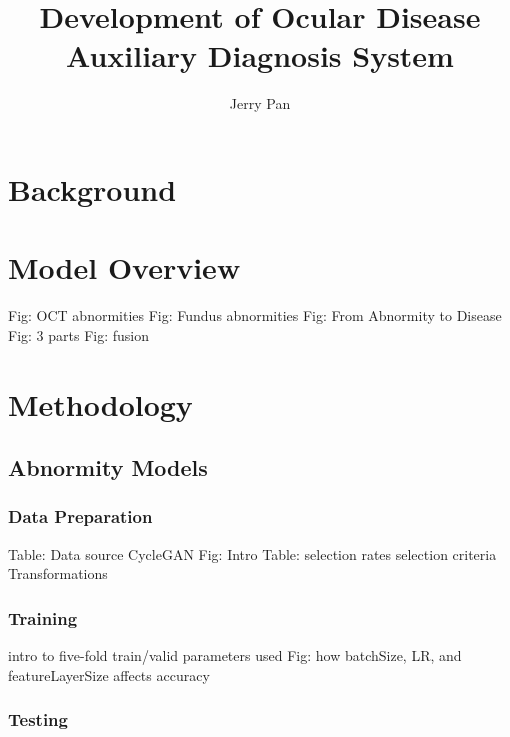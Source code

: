 \documentclass{article}
\begin{document}
	\title{\vspace{-2.25cm} Development of Ocular Disease Auxiliary Diagnosis System}
	\author{Jerry Pan}
	\date{}
	\maketitle
	
	\vspace{0.5cm}
	\tableofcontents
	
	\pagebreak
	
	\section{Background}
	
	\section{Model Overview}
		
		Fig: OCT abnormities
		Fig: Fundus abnormities
		Fig: From Abnormity to Disease
		Fig: 3 parts
		Fig: fusion
		
	\section{Methodology}
	
		\subsection{Abnormity Models}
		
			\subsubsection{Data Preparation}
			
				Table: Data source
				CycleGAN
					Fig: Intro
					Table: selection rates
					selection criteria
				Transformations
				
			\subsubsection{Training}
				
				intro to five-fold train/valid
				parameters used
				Fig: how batchSize, LR, and featureLayerSize affects accuracy
				
			\subsubsection{Testing}
			
\end{document}
